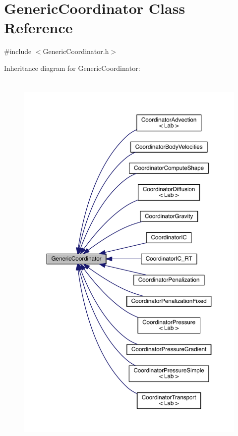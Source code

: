 \hypertarget{class_generic_coordinator}{}\section{Generic\+Coordinator Class Reference}
\label{class_generic_coordinator}


{\ttfamily \#include $<$Generic\+Coordinator.\+h$>$}



Inheritance diagram for Generic\+Coordinator\+:\nopagebreak
\begin{figure}[H]
\begin{center}
\leavevmode
\includegraphics[height=550pt]{d1/d98/class_generic_coordinator__inherit__graph}
\end{center}
\end{figure}



